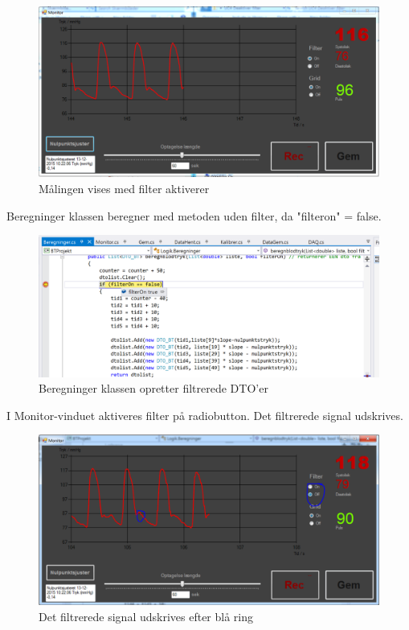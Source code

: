 \begin{figure}[H]
	\centering
	\includegraphics[width=1\textwidth]{Figurer/Test_Deaktiver_1}
	\caption{Målingen vises med filter aktiverer}
\end{figure}

Beregninger klassen beregner med metoden uden filter, da "filteron" = false.

\begin{figure}[H]
	\centering
	\includegraphics[width=1\textwidth]{Figurer/Test_Deaktiver_2}
	\caption{Beregninger klassen opretter filtrerede DTO'er}
\end{figure}

I Monitor-vinduet aktiveres filter på radiobutton. Det filtrerede signal udskrives. 

\begin{figure}[H]
	\centering
	\includegraphics[width=1\textwidth]{Figurer/Test_Deaktiver_3}
	\caption{Det filtrerede signal udskrives efter blå ring}
\end{figure}

